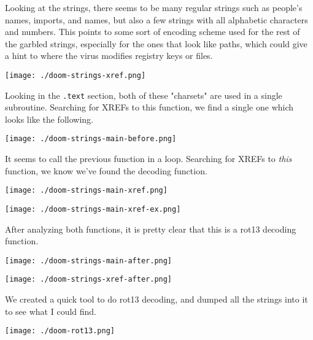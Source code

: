 \documentclass[11pt]{article}
\begin{document}
Looking at the strings, there seems to be many regular strings such as
people's names, imports, and names, but also a few strings with all
alphabetic characters and numbers. This points to some sort of
encoding scheme used for the rest of the garbled strings, especially
for the ones that look like paths, which could give a hint to where
the virus modifies registry keys or files.

\begin{center}
\texttt{[image: ./doom-strings-xref.png]}
\end{center}

Looking in the \texttt{.text} section, both of these "charsets" are used in a
single subroutine. Searching for XREFs to this function, we find a
single one which looks like the following.

\begin{center}
\texttt{[image: ./doom-strings-main-before.png]}
\end{center}

It seems to call the previous function in a loop. Searching for
XREFs to \emph{this} function, we know we've found the decoding
function.

\begin{center}
\texttt{[image: ./doom-strings-main-xref.png]}
\end{center}

\begin{center}
\texttt{[image: ./doom-strings-main-xref-ex.png]}
\end{center}

After analyzing both functions, it is pretty clear that this is a
rot13 decoding function.

\begin{center}
\texttt{[image: ./doom-strings-main-after.png]}
\end{center}

\begin{center}
\texttt{[image: ./doom-strings-xref-after.png]}
\end{center}

We created a quick tool to do rot13 decoding, and dumped all the
strings into it to see what I could find.

\begin{center}
\texttt{[image: ./doom-rot13.png]}
\end{center}
\end{document}
